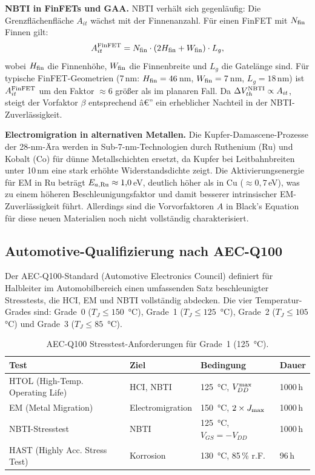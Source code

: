 ﻿\documentclass[a4paper,12pt]{article}
\theoremstyle{definition}
\begin{document}
\textbf{NBTI in FinFETs und GAA.}
NBTI verhält sich gegenläufig: Die Grenzflächenfläche $A_{it}$ wächst mit der
Finnenanzahl. Für einen FinFET mit $N_{\rm fin}$ Finnen gilt:
\[
A_{it}^{\rm FinFET} = N_{\rm fin} \cdot (2 H_{\rm fin} + W_{\rm fin}) \cdot L_g,
\]
wobei $H_{\rm fin}$ die Finnenhöhe, $W_{\rm fin}$ die Finnenbreite und $L_g$ die
Gatelänge sind. Für typische FinFET-Geometrien (7\,nm: $H_{\rm fin} = 46$\,nm,
$W_{\rm fin} = 7$\,nm, $L_g = 18$\,nm) ist $A_{it}^{\rm FinFET}$ um den Faktor
$\approx 6$ größer als im planaren Fall. Da $\Delta V_{th}^{\rm NBTI} \propto A_{it}$,
steigt der Vorfaktor $\beta$ entsprechend â€” ein erheblicher Nachteil in der
NBTI-Zuverlässigkeit.

\textbf{Electromigration in alternativen Metallen.}
Die Kupfer-Damascene-Prozesse der 28-nm-Ära werden in Sub-7-nm-Technologien durch
Ruthenium (Ru) und Kobalt (Co) für dünne Metallschichten ersetzt, da Kupfer
bei Leitbahnbreiten unter 10\,nm eine stark erhöhte Widerstandsdichte zeigt.
Die Aktivierungsenergie für EM in Ru beträgt $E_{a,{\rm Ru}} \approx 1{,}0$\,eV,
deutlich höher als in Cu ($\approx 0{,}7$\,eV), was zu einem höheren
Beschleunigungsfaktor und damit besserer intrinsischer EM-Zuverlässigkeit führt.
Allerdings sind die Vorvorfaktoren $A$ in Black's Equation für diese neuen
Materialien noch nicht vollständig charakterisiert.

\subsection{Automotive-Qualifizierung nach AEC-Q100}
\label{sub:automotive}

Der AEC-Q100-Standard (Automotive Electronics Council) definiert für
Halbleiter im Automobilbereich einen umfassenden Satz beschleunigter Stresstests,
die HCI, EM und NBTI vollständig abdecken. Die vier Temperatur-Grades sind:
Grade~0 ($T_J \leq 150$\, °C), Grade~1 ($T_J \leq 125$\, °C), Grade~2
($T_J \leq 105$\, °C) und Grade~3 ($T_J \leq 85$\, °C).

\begin{table}[htbp]
	\centering
	\caption{AEC-Q100 Stresstest-Anforderungen für Grade~1 (125\, °C).}
	\label{tab:aecq100}
	\begin{tabular}{@{}llll@{}}
		\toprule
		Test & Ziel & Bedingung & Dauer \\
		\midrule
		HTOL (High-Temp. Operating Life) & HCI, NBTI & 125\, °C, $V_{DD}^{\rm max}$ & 1000\,h \\
		EM (Metal Migration) & Electromigration & 150\, °C, $2\times J_{\rm max}$ & 1000\,h \\
		NBTI-Stresstest & NBTI & 125\, °C, $V_{GS} = -V_{DD}$ & 1000\,h \\
		HAST (Highly Acc. Stress Test) & Korrosion & 130\, °C, 85\,\% r.F. & 96\,h \\
		\bottomrule
	\end{tabular}
\end{table}
\end{document}
